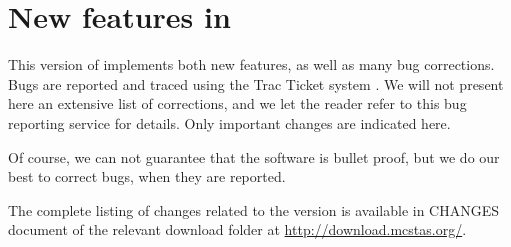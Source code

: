 
\chapter{New features in \MCS \version\ }
\label{c:changes}


This version of \MCS implements both new features, as well as many bug corrections. Bugs are reported and traced using the \MCS Trac Ticket system \cite{github_issue_webpage}. We will not present here an extensive list of corrections, and we let the reader refer to this bug reporting service for details. Only important changes are indicated here.

Of course, we can not guarantee that the software is bullet proof, but we do our best to correct bugs, when they are reported.

The complete listing of changes related to the version \MCS \version
is available in CHANGES document of the relevant download folder at
\url{http://download.mcstas.org/}.
